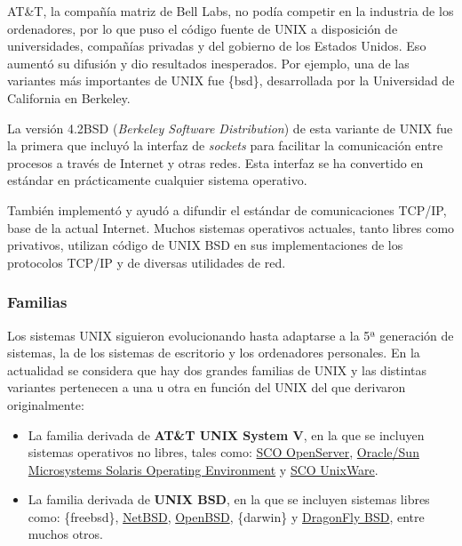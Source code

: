 AT\&T, la compañía matriz de Bell Labs, no podía competir en la
industria de los ordenadores, por lo que puso el código fuente de UNIX a
disposición de universidades, compañías privadas y del gobierno de los
Estados Unidos. Eso aumentó su difusión y dio resultados inesperados.
Por ejemplo, una de las variantes más importantes de UNIX fue \{bsd\},
desarrollada por la Universidad de California en Berkeley.

La versión 4.2BSD (\emph{Berkeley Software Distribution}) de esta
variante de UNIX fue la primera que incluyó la interfaz de
\emph{sockets} para facilitar la comunicación entre procesos a través de
Internet y otras redes. Esta interfaz se ha convertido en estándar en
prácticamente cualquier sistema operativo.

También implementó y ayudó a difundir el estándar de comunicaciones
TCP/IP, base de la actual Internet. Muchos sistemas operativos actuales,
tanto libres como privativos, utilizan código de UNIX BSD en sus
implementaciones de los protocolos TCP/IP y de diversas utilidades de
red.

\subsubsection{Familias}\label{_familias}

Los sistemas UNIX siguieron evolucionando hasta adaptarse a la 5ª
generación de sistemas, la de los sistemas de escritorio y los
ordenadores personales. En la actualidad se considera que hay dos
grandes familias de UNIX y las distintas variantes pertenecen a una u
otra en función del UNIX del que derivaron originalmente:

\begin{itemize}
\item
  La familia derivada de \textbf{AT\&T UNIX System V}, en la que se
  incluyen sistemas operativos no libres, tales como:
  \href{https://es.wikipedia.org/wiki/SCO_OpenServer}{SCO OpenServer},
  \href{https://es.wikipedia.org/wiki/Solaris_(sistema_operativo)}{Oracle/Sun
  Microsystems Solaris Operating Environment} y
  \href{https://es.wikipedia.org/wiki/UnixWare}{SCO UnixWare}.
\item
  La familia derivada de \textbf{UNIX BSD}, en la que se incluyen
  sistemas libres como: \{freebsd\},
  \href{https://es.wikipedia.org/wiki/NetBSD}{NetBSD},
  \href{https://es.wikipedia.org/wiki/OpenBSD}{OpenBSD}, \{darwin\} y
  \href{https://es.wikipedia.org/wiki/DragonFly_BSD}{DragonFly BSD},
  entre muchos otros.
\end{itemize}

